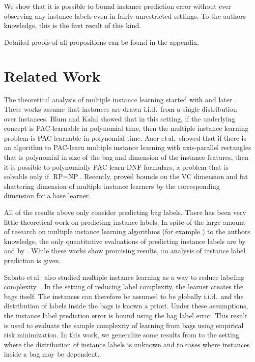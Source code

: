 We show that it is possible to bound instance prediction error without
ever observing any instance labels even in fairly unrestricted settings.
To the authors knowledge, this is the first result of this kind.

Detailed proofs of all propositions can be found in the appendix.

\section{Related Work}
The theoretical analysis of multiple instance learning started with \citet{auer1997approximating} and later \citet{blum1998note}.
These works assume that instances are drawn i.i.d.\ from a single distribution over instances. Blum and Kalai showed that in this
setting, if the underlying concept is PAC-learnable in polynomial time, then the multiple instance learning problem is PAC-learnable
in polynomial time. Auer et\,al.\ showed that if there is an algorithm to PAC-learn multiple instance learning with axis-parallel
rectangles that is polynomial in size of the bag and dimension of the instance features, then it is possible to polynomially
PAC-learn DNF-formulars, a problem that is solvable only if $\text{RP}=\text{NP}$.
Recently, \citet{sabato2009homogeneous,DBLP:journals/corr/abs-1107-2021} proved bounds on the VC dimension and
fat shattering dimension of multiple instance learners by the corresponding dimension for a base learner.

All of the results above only consider predicting bag labels. There has been very little theoretical work
on predicting instance labels. In spite of the large amount of research on multiple instance learning algorithms 
(for example \citet{andrews2003support,gaertner2002multi,zhou2009multi,li2009convex,zhang2002dd,mangasarian2008multiple,leistner2010miforests,chen2006miles})
to the authors knowledge, the only quantitative evaluations of predicting
instance labels are by \citet{gehler2007deterministic} and by \citet{liconvex2010}. While these works show promising results,
no analysis of instance label prediction is given.

Sabato et\,al.\ also studied multiple instance learning as a way
to reduce labeling complexity~\citep{sabato2010reducing}.
In the setting of reducing label complexity, the learner creates
the bags itself. The instances can therefore be assumed to be globally i.i.d.\ and
the distribution of labels inside the bags is known a priori.
Under these assumptions, the instance label prediction error is bound using the bag label error.
This result is used to evaluate the sample complexity of learning from bags using empirical risk minimization.
In this work, we generalize some results from \citet{sabato2010reducing} to the setting where the distribution
of instance labels is unknown and to cases where instances inside a bag may be dependent.

